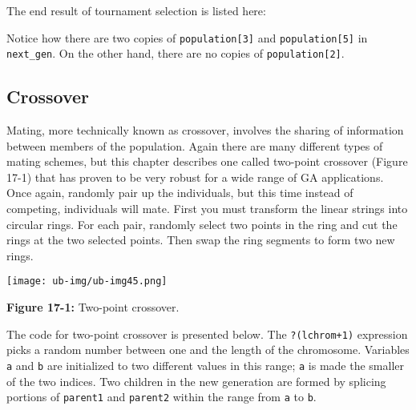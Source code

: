 The end result of tournament selection is listed here:


Notice how there are two copies of \texttt{population[3]} and
\texttt{population[5]} in \texttt{next\_gen}. On the other hand, there
are no copies of \texttt{population[2]}.

\subsection*{Crossover}

Mating, more technically known as crossover, involves the sharing of
information between members of the population. Again there are many
different types of mating schemes, but this chapter describes one
called two-point crossover (Figure 17-1) that has proven to be very
robust for a wide range of GA applications. Once again, randomly pair
up the individuals, but this time instead of competing, individuals
will mate. First you must transform the linear strings into circular
rings. For each pair, randomly select two points in the ring and cut
the rings at the two selected points. Then swap the ring segments to
form two new rings.\\


\begin{center}
\texttt{[image: ub-img/ub-img45.png]}
\end{center}

{\sffamily\bfseries Figure 17-1:}
{\sffamily Two-point crossover.}

The code for two-point crossover is presented below. The
\texttt{?(lchrom+1)} expression picks a random number between one and
the length of the chromosome. Variables \texttt{a} and \texttt{b} are
initialized to two different values in this range; \texttt{a} is made
the smaller of the two indices. Two children in the new generation are
formed by splicing portions of \texttt{parent1} and \texttt{parent2}
within the range from \texttt{a} to \texttt{b}.

